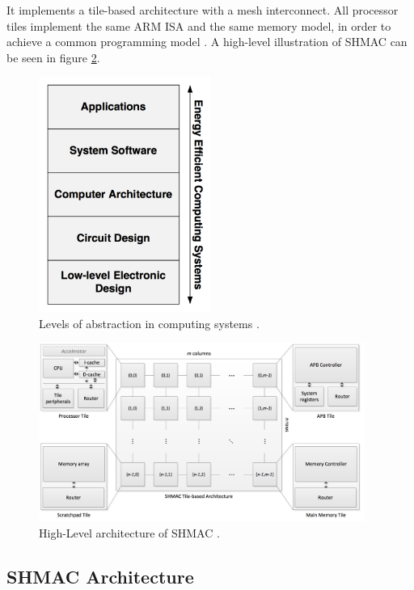 It implements a tile-based architecture with a mesh interconnect. All processor tiles implement the same
ARM ISA and the same memory model, in order to achieve a common programming model \cite{shmac-plan}.
A high-level illustration of SHMAC can be seen in figure \ref{fig:shmac}.

\begin{figure}[htb]
    \centering
    \includegraphics[width=0.5\textwidth]{Figures/Heterogeneous/SHMACAbstractionLevels}
    \caption{Levels of abstraction in computing systems \cite{shmac-plan}.}
    \label{fig:shmacAbstractionLevels}
\end{figure}

\begin{figure}[htb]
    \centering
    \includegraphics[width=0.95\textwidth]{Figures/Heterogeneous/SHMAC}
    \caption{High-Level architecture of SHMAC \cite{shmac-plan}.}
    \label{fig:shmac}
\end{figure}

\subsection{SHMAC Architecture}

